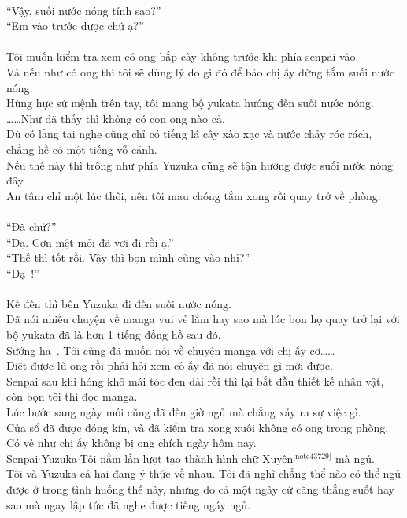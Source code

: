 \documentclass[12pt,a4paper, twosides]{book}
\begin{document}
\\
“Vậy, suối nước nóng tính sao?”\\
“Em vào trước được chứ ạ?”\\
\\
Tôi muốn kiểm tra xem có ong bắp cày không trước khi phía senpai vào.\\
Và nếu như có ong thì tôi sẽ dùng lý do gì đó để bảo chị ấy dừng tắm suối nước nóng.\\
Hừng hực sứ mệnh trên tay, tôi mang bộ yukata hướng đến suối nước nóng.\\
……Như đã thấy thì không có con ong nào cả.\\
Dù có lắng tai nghe cũng chỉ có tiếng lá cây xào xạc và nước chảy róc rách, chẳng hề có một tiếng vỗ cánh.\\
Nếu thế này thì trông như phía Yuzuka cũng sẽ tận hưởng được suối nước nóng đây.\\
An tâm chỉ một lúc thôi, nên tôi mau chóng tắm xong rồi quay trở về phòng.\\
\\
“Đã chứ?”\\
“Dạ. Cơn mệt mỏi đã vơi đi rồi ạ.”\\
“Thế thì tốt rồi. Vậy thì bọn mình cũng vào nhỉ?”\\
“Dạ~!”\\
\\
Kế đến thì bên Yuzuka đi đến suối nước nóng.\\
Đã nói nhiều chuyện về manga vui vẻ lắm hay sao mà lúc bọn họ quay trở lại với bộ yukata đã là hơn 1 tiếng đồng hồ sau đó.\\
Sướng ha~. Tôi cũng đã muốn nói về chuyện manga với chị ấy cơ……\\
Diệt được lũ ong rồi phải hỏi xem cô ấy đã nói chuyện gì mới được.\\
Senpai sau khi hóng khô mái tóc đen dài rồi thì lại bắt đầu thiết kế nhân vật, còn bọn tôi thì đọc manga.\\
Lúc bước sang ngày mới cũng đã đến giờ ngủ mà chẳng xảy ra sự việc gì.\\
Cửa sổ đã được đóng kín, và đã kiểm tra xong xuôi không có ong trong phòng. Có vẻ như chị ấy không bị ong chích ngày hôm nay.\\
Senpai$\cdot$Yuzuka$\cdot$Tôi nằm lần lượt tạo thành hình chữ Xuyên$^\text{[note43729]}$ mà ngủ.\\
Tôi và Yuzuka cả hai đang ý thức về nhau. Tôi đã nghĩ chẳng thể nào có thể ngủ được ở trong tình huống thế này, nhưng do cả một ngày cứ căng thẳng suốt hay sao mà ngay lập tức đã nghe được tiếng ngáy ngủ.\\
\end{document}
